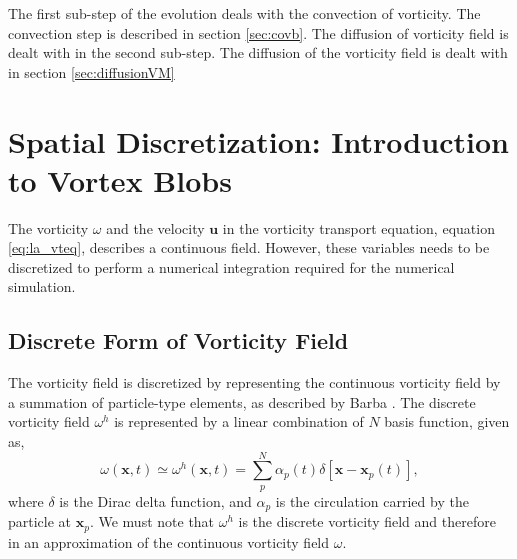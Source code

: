 The first sub-step of the evolution deals with the convection of vorticity. The convection step is described in section \ref{sec:covb}. The diffusion of vorticity field is dealt with in the second sub-step. The diffusion of the vorticity field is dealt with in section \ref{sec:diffusionVM}


\section{Spatial Discretization: Introduction to Vortex Blobs}
\label{sec:spatialDiscretization}

The vorticity $\omega$ and the velocity $\mathbf{u}$ in the vorticity transport equation, equation \ref{eq:la_vteq}, describes a continuous field. However, these variables needs to be discretized to perform a numerical integration required for the numerical simulation. 

\subsection{Discrete Form of Vorticity Field}
\label{subsec:discreteVorticity}
The vorticity field is discretized by representing the continuous vorticity field by a summation of particle-type elements, as described by Barba \cite{Barba2010a}. The discrete vorticity field $\omega^h$ is represented by a linear combination of $N$ basis function, given as,
	\begin{equation}
	\omega\left(\mathbf{x},t\right) \simeq \omega^h\left(\mathbf{x},t\right) = \sum_{p}^N\alpha_p\left(t\right)\delta \left[\mathbf{x}-\mathbf{x}_p\left(t\right)\right],
	\end{equation}
where $\delta$ is the Dirac delta function, and $\alpha_{p}$ is the circulation carried by the particle at $\mathbf{x}_p$. We must note that $\omega^h$ is the discrete vorticity field and therefore in an approximation of the continuous vorticity field $\omega$. 

